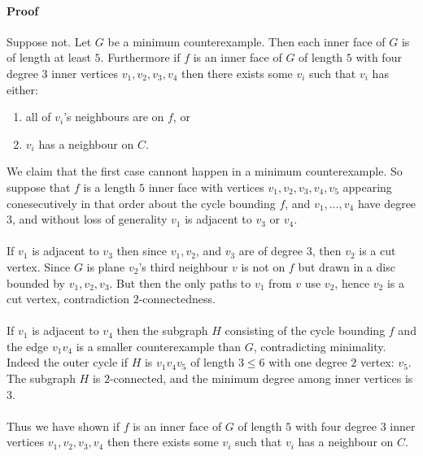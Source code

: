 \documentclass[letterpaper,12pt,oneside,onecolumn]{article}
\begin{document}
\paragraph{Proof}
Suppose not. Let $G$ be a minimum counterexample. Then each inner face of $G$ is of length at least $5$. Furthermore if $f$ is an inner face of $G$ of length $5$ with four degree $3$ inner vertices $v_1,v_2, v_3,v_4$ then there exists some $v_i$ such that $v_i$ has either:
\begin{enumerate}
	\item all of $v_i$'s neighbours are on $f$, or
	\item $v_i$ has a neighbour on $C$.
\end{enumerate}
We claim that the first case cannont happen in a minimum counterexample. So suppose that $f$ is a length $5$ inner face with vertices $v_1,v_2, v_3, v_4, v_5$ appearing conesecutively in that order about the cycle bounding $f$, and $v_1, \dots, v_4$ have degree $3$, and without loss of generality $v_1$ is adjacent to $v_3$ or $v_4$. 
\paragraph{}
If $v_1$ is adjacent to $v_3$ then since $v_1, v_2$, and $v_3$ are of degree $3$, then $v_2$ is a cut vertex. Since $G$ is plane $v_2$'s third neighbour $v$ is not on $f$ but drawn in a disc bounded by $v_1,v_2,v_3$. But then the only paths to $v_1$ from $v$ use $v_2$, hence $v_2$ is a cut vertex, contradiction $2$-connectedness.
\paragraph{}
If $v_1$ is adjacent to $v_4$ then the subgraph $H$ consisting of the cycle bounding $f$ and the edge $v_1v_4$ is a smaller counterexample than $G$, contradicting minimality. Indeed the outer cycle if $H$ is $v_1v_4v_5$ of length $3 \leq 6$ with one degree $2$ vertex: $v_5$. The subgraph $H$ is $2$-connected, and the minimum degree among inner vertices is $3$.
\paragraph{}
Thus we have shown if $f$ is an inner face of $G$ of length $5$ with four degree $3$ inner vertices $v_1,v_2, v_3,v_4$ then there exists some $v_i$ such that $v_i$ has a neighbour on $C$.
\end{document}
